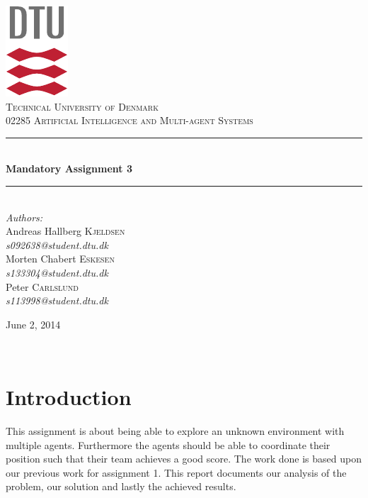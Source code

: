 \documentclass[11pt]{report}
\newcommand{\HRule}{\rule{\linewidth}{0.5mm}}
\begin{document}
\begin{titlepage}
\begin{center}

\includegraphics[scale=2.0]{../GFX/dtu_logo.pdf}\\[1cm]

\textsc{\LARGE Technical University of Denmark}\\[1.5cm]

\textsc{\Large 02285 Artificial Intelligence and Multi-agent Systems}\\[0.5cm]

\HRule \\[0.4cm]
{\huge \bfseries Mandatory Assignment 3}\\[0.1cm]
\HRule \\[1.5cm]

\large
\emph{Authors:}
\\[10pt]
Andreas Hallberg \textsc{Kjeldsen}\\
\emph{s092638@student.dtu.dk}
\\[10pt]
Morten Chabert \textsc{Eskesen}\\
\emph{s133304@student.dtu.dk}
\\[10pt]
Peter \textsc{Carlslund}\\
\emph{s113998@student.dtu.dk}

\vfill

{\large June 2, 2014}

\end{center}
\end{titlepage}

${}$
\section*{Introduction}
This assignment is about being able to explore an unknown environment with multiple agents. Furthermore the agents should be able to coordinate their position such that their team achieves a good score. The work done is based upon our previous work for assignment 1. This report documents our analysis of the problem, our solution and lastly the achieved results.
\end{document}
